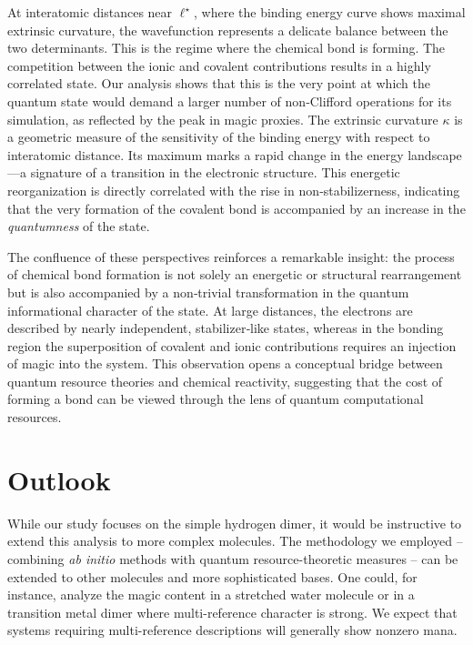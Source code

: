 \documentclass[aps, prl, twocolumn, groupedaddress, reprint, floatfix, nofootinbib, longbibliography]{revtex4-2}
\begin{document}
        At interatomic distances near $\ell^\star$, where the binding energy curve shows maximal extrinsic curvature, the wavefunction represents a delicate balance between the two determinants. This is the regime where the chemical bond is forming. The competition between the ionic and covalent contributions results in a highly correlated state. Our analysis shows that this is the very point at which the quantum state would demand a larger number of non‑Clifford operations for its simulation, as reflected by the peak in magic proxies. The extrinsic curvature $\kappa$ is a geometric measure of the sensitivity of the binding energy with respect to interatomic distance. Its maximum marks a rapid change in the energy landscape—a signature of a transition in the electronic structure. This energetic reorganization is directly correlated with the rise in non‑stabilizerness, indicating that the very formation of the covalent bond is accompanied by an increase in the \textit{quantumness} of the state.

        The confluence of these perspectives reinforces a remarkable insight: the process of chemical bond formation is not solely an energetic or structural rearrangement but is also accompanied by a non‑trivial transformation in the quantum informational character of the state. At large distances, the electrons are described by nearly independent, stabilizer‑like states, whereas in the bonding region the superposition of covalent and ionic contributions requires an injection of magic into the system. This observation opens a conceptual bridge between quantum resource theories and chemical reactivity, suggesting that the cost of forming a bond can be viewed through the lens of quantum computational resources.

\section{Outlook}

    While our study focuses on the simple hydrogen dimer, it would be instructive to extend this analysis to more complex molecules. The methodology we employed – combining \textit{ab initio} methods with quantum resource-theoretic measures – can be extended to other molecules and more sophisticated bases. One could, for instance, analyze the magic content in a stretched water molecule or in a transition metal dimer where multi-reference character is strong. We expect that systems requiring multi-reference descriptions will generally show nonzero mana.
\end{document}
